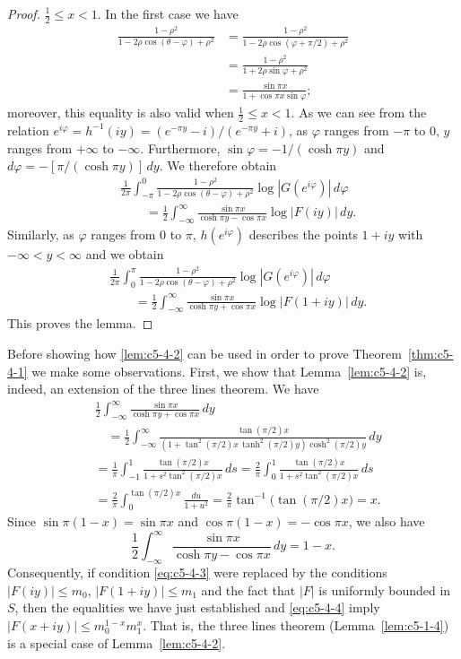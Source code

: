 \begin{proof}
$\frac{1}{2} \leq x < 1$. In the first case we have
\begin{align*}
\frac{1-\rho^{2}}{1-2\rho\cos(\theta-\varphi)+\rho^{2}}
&=\frac{1-\rho^{2}}{1-2\rho\cos(\varphi+\pi/2)+\rho^{2}}\\
&=\frac{1-\rho^{2}}{1+2\rho\sin\varphi+\rho^{2}}\\
&=\frac{\sin\pi x}{1+\cos\pi x\sin\varphi};
\end{align*}
moreover, this equality is also valid when $\frac{1}{2} \leq x < 1$. As we can
see from the relation
$e^{i\varphi} = h^{-1}(iy) = (e^{-\pi y} - i)/(e^{-\pi y} + i)$, as $\varphi$
ranges from $-\pi$ to 0, $y$ ranges from $+\infty$ to $-\infty$. Furthermore,
$\sin\varphi = -1/(\cosh\pi y)$ and
$d\varphi = -[\pi/(\cosh\pi y)]\,dy$. We therefore obtain
\begin{align*}
&\frac{1}{2\pi}\int_{-\pi}^{0}\frac{1-\rho^{2}}{1-2\rho\cos(\theta-\varphi)+\rho^{2}}\log|G(e^{i\varphi})|\,d\varphi\\
&\qquad=\frac{1}{2}\int_{-\infty}^{\infty}\frac{\sin\pi x}{\cosh\pi y-\cos\pi x}\log|F(iy)|\,dy.
\end{align*}
Similarly, as $\varphi$ ranges from 0 to $\pi$, $h(e^{i\varphi})$ describes the
points $1 + iy$ with $-\infty < y < \infty$ and we obtain
\begin{align*}
&\frac{1}{2\pi}\int_{0}^{\pi}\frac{1-\rho^{2}}{1-2\rho\cos(\theta-\varphi)+\rho^{2}}\log|G(e^{i\varphi})|\,d\varphi\\
&\qquad=\frac{1}{2}\int_{-\infty}^{\infty}\frac{\sin\pi x}{\cosh\pi y+\cos\pi x}\log|F(1+iy)|\,dy.
\end{align*}
This proves the lemma.
\end{proof}

Before showing how \eqref{lem:c5-4-2} can be used in order to prove
Theorem~\ref{thm:c5-4-1} we make some observations. First, we show that
Lemma~\ref{lem:c5-4-2} is, indeed, an extension of the three lines theorem. We
have
\begin{align*}
&\frac{1}{2}\int_{-\infty}^{\infty}\frac{\sin\pi x}{\cosh\pi y+\cos\pi x}\,dy\\
&\quad=\frac{1}{2}\int_{-\infty}^{\infty}
\frac{\tan(\pi/2)x}{(1+\tan^{2}(\pi/2)x\,\tanh^{2}(\pi/2)y)\cosh^{2}(\pi/2)y}\,dy\\
&=\frac{1}{\pi}\int_{-1}^{1}\frac{\tan(\pi/2)x}{1+s^{2}\tan^{2}(\pi/2)x}\,ds
=\frac{2}{\pi}\int_{0}^{1}\frac{\tan(\pi/2)x}{1+s^{2}\tan^{2}(\pi/2)x}\,ds\\
&=\frac{2}{\pi}\int_{0}^{\tan(\pi/2)x}\frac{du}{1+u^{2}}
=\frac{2}{\pi}\tan^{-1}\bigl(\tan(\pi/2)x\bigr)=x.
\end{align*}
Since $\sin\pi(1-x) = \sin\pi x$ and $\cos\pi(1-x) = -\cos\pi x$, we also have
\[
\frac{1}{2}\int_{-\infty}^{\infty}\frac{\sin\pi x}{\cosh\pi y-\cos\pi x}\,dy=1-x.
\]
Consequently, if condition \eqref{eq:c5-4-3} were replaced by the conditions
$|F(iy)| \leq m_{0}$, $|F(1 + iy)| \leq m_{1}$ and the fact that $|F|$ is
uniformly bounded in $S$, then the equalities we have just established and
\eqref{eq:c5-4-4} imply $|F(x + iy)| \leq m_{0}^{1-x}m_{1}^{x}$. That is, the
three lines theorem (Lemma~\ref{lem:c5-1-4}) is a special case of
Lemma~\ref{lem:c5-4-2}.


